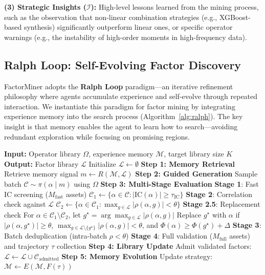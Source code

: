 \documentclass[sigconf]{acmart}
\begin{document}
\textbf{(3) Strategic Insights ($\mathcal{I}$):} High-level lessons learned from the mining process, such as the observation that non-linear combination strategies (e.g., XGBoost-based synthesis) significantly outperform linear ones, or specific operator warnings (e.g., the instability of high-order moments in high-frequency data).

\subsection{Ralph Loop: Self-Evolving Factor Discovery}

FactorMiner adopts the \textbf{Ralph Loop} paradigm---an iterative refinement philosophy where agents accumulate experience and self-evolve through repeated interaction.
We instantiate this paradigm for factor mining by integrating experience memory into the search process (Algorithm~\ref{alg:ralph}).
The key insight is that memory enables the agent to learn how to search---avoiding redundant exploration while focusing on promising regions.

\begin{algorithm}[t]
\caption{Ralph Loop: Self-Evolving Factor Discovery}
\label{alg:ralph}
\begin{algorithmic}
\STATE \textbf{Input:} Operator library $\Omega$, experience memory $\mathcal{M}$, target library size $K$
\STATE \textbf{Output:} Factor library $\mathcal{L}$
\STATE Initialize $\mathcal{L} \leftarrow \emptyset$
\REPEAT
  \STATE \textbf{Step 1: Memory Retrieval}
  \STATE \quad Retrieve memory signal $m \leftarrow R(\mathcal{M}, \mathcal{L})$
  \STATE \textbf{Step 2: Guided Generation}
  \STATE \quad Sample batch $\mathcal{C} \sim \pi(\alpha \mid m)$ using $\Omega$
  \STATE \textbf{Step 3: Multi-Stage Evaluation}
  \STATE \quad \textbf{Stage 1}: Fast IC screening ($M_{\text{fast}}$ assets)
  \STATE \quad \quad $\mathcal{C}_1 \leftarrow \{\alpha \in \mathcal{C} : |\text{IC}(\alpha)| \geq \tau_{\text{IC}}\}$
  \STATE \quad \textbf{Stage 2}: Correlation check against $\mathcal{L}$
  \STATE \quad \quad $\mathcal{C}_2 \leftarrow \{\alpha \in \mathcal{C}_1 : \max_{g \in \mathcal{L}} |\rho(\alpha, g)| < \theta\}$
  \STATE \quad \textbf{Stage 2.5}: Replacement check
  \STATE \quad \quad For $\alpha \in \mathcal{C}_1 \setminus \mathcal{C}_2$, let $g^\star=\arg\max_{g \in \mathcal{L}} |\rho(\alpha,g)|$
  \STATE \quad \quad Replace $g^\star$ with $\alpha$ if $|\rho(\alpha,g^\star)| \ge \theta$,
  \STATE \quad \quad $\max_{g \in \mathcal{L}\setminus\{g^\star\}} |\rho(\alpha,g)| < \theta$, and $\Phi(\alpha) \ge \Phi(g^\star) + \Delta$
  \STATE \quad \textbf{Stage 3}: Batch deduplication (intra-batch $\rho < \theta$)
  \STATE \quad \textbf{Stage 4}: Full validation ($M_{\text{full}}$ assets) and trajectory $\tau$ collection
  \STATE \textbf{Step 4: Library Update}
  \STATE \quad Admit validated factors: $\mathcal{L} \leftarrow \mathcal{L} \cup \mathcal{C}_{\text{admitted}}$
  \STATE \textbf{Step 5: Memory Evolution}
  \STATE \quad Update strategy: $\mathcal{M} \leftarrow E(\mathcal{M}, F(\tau))$
\end{algorithmic}
\end{algorithm}
\end{document}
